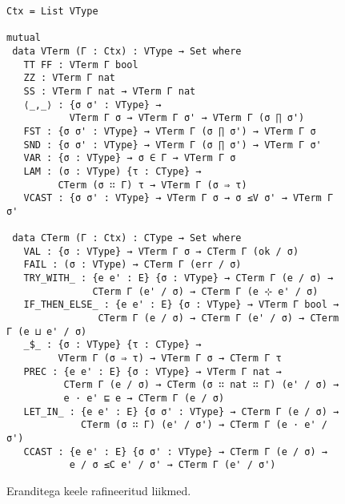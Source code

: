 \documentclass[a4paper,12pt]{article}
\begin{document}
\begin{figure}
  \begin{BVerbatim}
Ctx = List VType

mutual
 data VTerm (Γ : Ctx) : VType → Set where
   TT FF : VTerm Γ bool
   ZZ : VTerm Γ nat
   SS : VTerm Γ nat → VTerm Γ nat
   ⟨_,_⟩ : {σ σ' : VType} →
           VTerm Γ σ → VTerm Γ σ' → VTerm Γ (σ ∏ σ')
   FST : {σ σ' : VType} → VTerm Γ (σ ∏ σ') → VTerm Γ σ
   SND : {σ σ' : VType} → VTerm Γ (σ ∏ σ') → VTerm Γ σ'
   VAR : {σ : VType} → σ ∈ Γ → VTerm Γ σ
   LAM : (σ : VType) {τ : CType} →
         CTerm (σ ∷ Γ) τ → VTerm Γ (σ ⇒ τ)
   VCAST : {σ σ' : VType} → VTerm Γ σ → σ ≤V σ' → VTerm Γ σ'

 data CTerm (Γ : Ctx) : CType → Set where
   VAL : {σ : VType} → VTerm Γ σ → CTerm Γ (ok / σ)
   FAIL : (σ : VType) → CTerm Γ (err / σ)
   TRY_WITH_ : {e e' : E} {σ : VType} → CTerm Γ (e / σ) →
               CTerm Γ (e' / σ) → CTerm Γ (e ⊹ e' / σ)
   IF_THEN_ELSE_ : {e e' : E} {σ : VType} → VTerm Γ bool →
                CTerm Γ (e / σ) → CTerm Γ (e' / σ) → CTerm Γ (e ⊔ e' / σ)
   _$_ : {σ : VType} {τ : CType} →
         VTerm Γ (σ ⇒ τ) → VTerm Γ σ → CTerm Γ τ
   PREC : {e e' : E} {σ : VType} → VTerm Γ nat →
          CTerm Γ (e / σ) → CTerm (σ ∷ nat ∷ Γ) (e' / σ) →
          e · e' ⊑ e → CTerm Γ (e / σ)
   LET_IN_ : {e e' : E} {σ σ' : VType} → CTerm Γ (e / σ) →
             CTerm (σ ∷ Γ) (e' / σ') → CTerm Γ (e · e' / σ')
   CCAST : {e e' : E} {σ σ' : VType} → CTerm Γ (e / σ) →
           e / σ ≤C e' / σ' → CTerm Γ (e' / σ')
  \end{BVerbatim}
  \caption{Eranditega keele rafineeritud liikmed.}
  \label{fig:exc.refined}
\end{figure}
\end{document}
